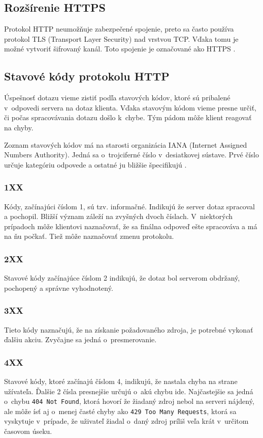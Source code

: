 \documentclass[slovak]{fitthesis}
\begin{document}
\subsection{Rozšírenie HTTPS}
Protokol HTTP neumožňuje zabezpečené spojenie, preto sa často používa protokol TLS (Transport Layer Security) nad vrstvou TCP. Vďaka tomu je možné vytvoriť šifrovaný kanál. Toto spojenie je označované ako HTTPS \cite{httpsRFC}.


\subsection{Stavové kódy protokolu HTTP}
Úspešnosť dotazu vieme zistiť podľa stavových kódov, ktoré sú pribalené v~odpovedi servera na dotaz klienta. Vďaka stavovým kódom vieme presne určiť, či počas spracovávania dotazu došlo k~chybe. Tým pádom môže klient reagovať na chyby.

Zoznam stavových kódov má na starosti organizácia IANA (Internet Assigned Numbers Authority). Jedná sa o~trojciferné číslo v~desiatkovej sústave. Prvé číslo určuje kategóriu odpovede a ostatné ju bližšie špecifikujú \cite{shiflett2003http}.

\subsubsection{1XX}
Kódy, začínajúci číslom 1, sú tzv. informačné. Indikujú že server dotaz spracoval a pochopil. Bližší význam záleží na zvyšných dvoch číslach. V~niektorých prípadoch môže klientovi naznačovať, že sa finálna odpoveď ešte spracováva a má na ňu počkať. Tiež môže naznačovať zmenu protokolu.

\label{2XX}
\subsubsection{2XX}
Stavové kódy začínajúce číslom 2 indikujú, že dotaz bol serverom obdržaný, pochopený a správne vyhodnotený.

\subsubsection{3XX}
Tieto kódy naznačujú, že na získanie požadovaného zdroja, je potrebné vykonať ďalšiu akciu. Zvyčajne sa jedná o~presmerovanie.

\label{4XX}
\subsubsection{4XX}
Stavové kódy, ktoré začínajú číslom 4, indikujú, že nastala chyba na strane užívateľa. Ďalšie 2 čísla presnejšie určujú o~akú chybu ide. Najčastejšie sa jedná o~chybu \texttt{404 Not Found}, ktorá hovorí že žiadaný zdroj nebol na serveri nájdený, ale môže ísť aj o~menej časté chyby ako \texttt{429 Too Many Requests}, ktorá sa vyskytuje v~prípade, že uživateľ žiadal o~daný zdroj príliš veľa krát v~určitom časovom úseku.
\end{document}
